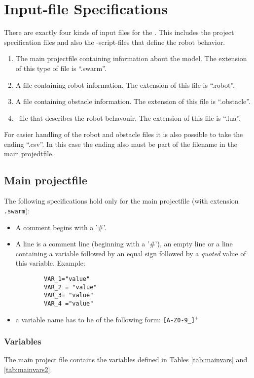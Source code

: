 \label{cp:inputfile}
\section{Input-file Specifications}

There are exactly four kinds of input files for the \RSS. This includes the project specification files and also the \Lua-script-files that define the robot behavior.
\begin{enumerate}
	\item The main projectfile containing information about the model. The extension of this type of file is ``.swarm''.
	\item A file containing robot information. The extension of this file is ``.robot''.
	\item A file containing obstacle information. The extension of this file is ``.obstacle''.
	\item \Lua\ file that describes the robot behavouir. The extension of this file is ``.lua''.
\end{enumerate}
For easier handling of the robot and obstacle files it is also possible to take the ending ``.csv''. In this case the ending also must be part of the filename in the main projedtfile.

\subsection{Main projectfile}
The following specifications hold only for the main projectfile (with extension \texttt{.swarm}):
\begin{itemize}
	\item A comment begins with a '\#'.
	\item A line is a comment line (beginning with a '\#'), an empty line or a line containing a variable followed by an equal sign followed by a \emph{quoted} value of this variable. Example:
	\begin{verbatim}
		VAR_1="value"
		VAR_2 = "value"
		VAR_3= "value"
		VAR_4 ="value"
	\end{verbatim}
	\item a variable name has to be of the following form: \texttt{[A-Z0-9\_]$^+$}
\end{itemize}


\subsubsection{Variables}
The main project file contains the variables defined in Tables \ref{tab:mainvars} and \ref{tab:mainvars2}.
	
